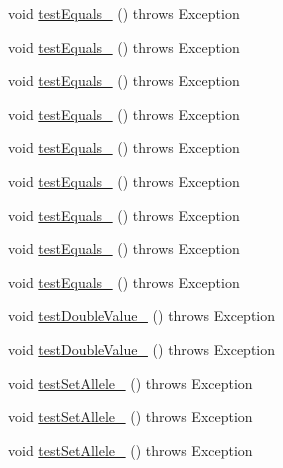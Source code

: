 \begin{DoxyCompactItemize}
\item 
void \hyperlink{classorg_1_1jgap_1_1impl_1_1_double_gene_test_af9a3e4d8317d87c95348ead2c0b95fe4}{test\-Equals\-\_} ()  throws Exception 
\item 
void \hyperlink{classorg_1_1jgap_1_1impl_1_1_double_gene_test_a6871997f6b7c418473e78a2821cf5911}{test\-Equals\-\_} ()  throws Exception 
\item 
void \hyperlink{classorg_1_1jgap_1_1impl_1_1_double_gene_test_a0affd301c5d8773b2867ca4418ce2438}{test\-Equals\-\_} ()  throws Exception 
\item 
void \hyperlink{classorg_1_1jgap_1_1impl_1_1_double_gene_test_a06cc41cb19a3825096d904fca9d6fc15}{test\-Equals\-\_} ()  throws Exception 
\item 
void \hyperlink{classorg_1_1jgap_1_1impl_1_1_double_gene_test_a9ae48071ab7b8abcf820ae64ea130b32}{test\-Equals\-\_} ()  throws Exception 
\item 
void \hyperlink{classorg_1_1jgap_1_1impl_1_1_double_gene_test_a478742fcdbebda4e0115cfe94b771b67}{test\-Equals\-\_} ()  throws Exception 
\item 
void \hyperlink{classorg_1_1jgap_1_1impl_1_1_double_gene_test_a41563726b9df5ecfefdbee96b982f330}{test\-Equals\-\_} ()  throws Exception 
\item 
void \hyperlink{classorg_1_1jgap_1_1impl_1_1_double_gene_test_addc7f311c47356f258591ff7bb765529}{test\-Equals\-\_} ()  throws Exception 
\item 
void \hyperlink{classorg_1_1jgap_1_1impl_1_1_double_gene_test_a190a9e7d542b280e4252cc286239f9a9}{test\-Equals\-\_} ()  throws Exception 
\item 
void \hyperlink{classorg_1_1jgap_1_1impl_1_1_double_gene_test_aade85a6cc2c643ee2b7e7e6a3613c32e}{test\-Double\-Value\-\_} ()  throws Exception 
\item 
void \hyperlink{classorg_1_1jgap_1_1impl_1_1_double_gene_test_aca6abd8b365765849b6d374c7002679a}{test\-Double\-Value\-\_} ()  throws Exception 
\item 
void \hyperlink{classorg_1_1jgap_1_1impl_1_1_double_gene_test_a7dda7da171e23f070fb95e1f5a99787f}{test\-Set\-Allele\-\_} ()  throws Exception 
\item 
void \hyperlink{classorg_1_1jgap_1_1impl_1_1_double_gene_test_a46c303a78cfab5eba0d8f3d5b09a7857}{test\-Set\-Allele\-\_} ()  throws Exception 
\item 
void \hyperlink{classorg_1_1jgap_1_1impl_1_1_double_gene_test_a600a455433fa2991b102e3a9adb230c3}{test\-Set\-Allele\-\_} ()  throws Exception 

\end{DoxyCompactItemize}
